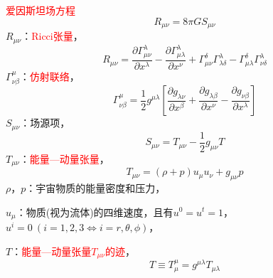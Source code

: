\documentclass[12pt,a4paper]{article}
\begin{document}
\textcolor{red}{爱因斯坦场方程}
\begin{equation}
R_{\mu\nu} = 8\pi G S_{\mu\nu}
\end{equation}
$R_{\mu\nu}$：\textcolor{red}{Ricci张量}，
\begin{equation}
R_{\mu\nu} = \frac{\partial \Gamma_{\mu\nu}^{\lambda}}{\partial x^{\lambda}} -\frac{\partial \Gamma_{\mu\lambda}^{\lambda}}{\partial x^{\nu}} +\Gamma_{\mu\nu}^{\delta}\Gamma_{\lambda\delta}^{\lambda} -\Gamma_{\mu\lambda}^{\delta}\Gamma_{\nu\delta}^{\lambda}
\end{equation}
$\Gamma_{\nu\beta}^{\mu}$：\textcolor{red}{仿射联络}，
\begin{equation}
\Gamma_{\nu\beta}^{\mu} = \frac{1}{2} g^{\mu\lambda} \left[\frac{\partial g_{\lambda \nu}}{\partial x^{\beta}} +\frac{\partial g_{\lambda\beta}}{\partial x^{\nu}} -\frac{\partial g_{\nu\beta}}{\partial x^{\lambda}} \right]
\end{equation}
$S_{\mu\nu}$：场源项，
\begin{equation}
S_{\mu\nu} = T_{\mu\nu} -\frac{1}{2}g_{\mu\nu} T
\end{equation}
$T_{\mu\nu}$：\textcolor{red}{能量—动量张量}，
\begin{equation}
T_{\mu\nu} = (\rho +p) u_{\mu}u_{\nu} +g_{\mu\nu} p
\end{equation}
$\rho$，$p$：宇宙物质的能量密度和压力，

$u_{\mu}$：物质(视为流体)的四维速度，且有$u^0 = u^t = 1$，$u^i = 0~ (i = 1,2,3 \Leftrightarrow i =r, \theta, \phi)$，

$T$：\textcolor{red}{能量—动量张量$T_{\mu\nu}$的迹}，
\begin{equation}
T \equiv T^{\mu}_{\mu} = g^{\mu\lambda} T_{\mu\lambda}
\end{equation}
\end{document}
